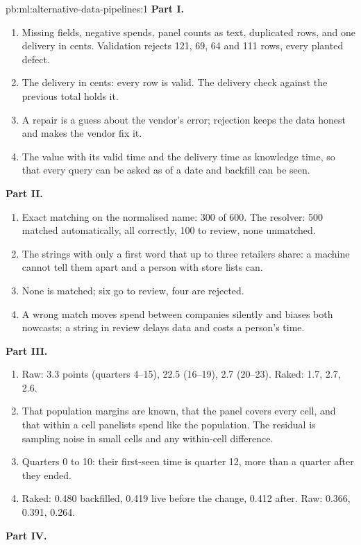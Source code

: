 \begin{solution}{pb:ml:alternative-data-pipelines:1}
\textbf{Part I.}
\begin{enumerate}
\item Missing fields, negative spends, panel counts as text, duplicated rows, and one delivery in cents. Validation rejects
121, 69, 64 and 111 rows, every planted defect.
\item The delivery in cents: every row is valid. The delivery check against the previous total holds it.
\item A repair is a guess about the vendor's error; rejection keeps the data honest and makes the vendor fix it.
\item The value with its valid time and the delivery time as knowledge time, so that every query can be asked as of a date
and backfill can be seen.
\end{enumerate}
\textbf{Part II.}
\begin{enumerate}[resume]
\item Exact matching on the normalised name: 300 of 600. The resolver: 500 matched automatically, all correctly, 100 to
review, none unmatched.
\item The strings with only a first word that up to three retailers share: a machine cannot tell them apart and a person
with store lists can.
\item None is matched; six go to review, four are rejected.
\item A wrong match moves spend between companies silently and biases both nowcasts; a string in review delays data and
costs a person's time.
\end{enumerate}
\textbf{Part III.}
\begin{enumerate}[resume]
\item Raw: 3.3 points (quarters 4--15), 22.5 (16--19), 2.7 (20--23). Raked: 1.7, 2.7, 2.6.
\item That population margins are known, that the panel covers every cell, and that within a cell panelists spend like the
population. The residual is sampling noise in small cells and any within-cell difference.
\item Quarters 0 to 10: their first-seen time is quarter 12, more than a quarter after they ended.
\item Raked: 0.480 backfilled, 0.419 live before the change, 0.412 after. Raw: 0.366, 0.391, 0.264.
\end{enumerate}
\textbf{Part IV.}
\begin{enumerate}[resume]

\end{enumerate}
\end{solution}
